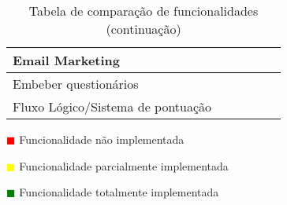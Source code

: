 \begin{table}[!ht]
\begin{center}
\begin{tabular}{|p{3cm}|p{0cm}|p{0cm}|p{0cm}|p{0cm}|p{0cm}|}
			Email Marketing &\cellcolor{red!80}  & \cellcolor{green!80} & \cellcolor{green!80} & \cellcolor{green!80} & \cellcolor{green!80}  \\ \hline
			
			 Embeber questionários& \cellcolor{green!80}  & \cellcolor{green!80}  & \cellcolor{green!80} & \cellcolor{green!80} & \cellcolor{green!80}  \\ \hline
			
			Fluxo Lógico/Sistema de pontuação &\cellcolor{yellow!80}  & \cellcolor{green!80} & \cellcolor{green!80} & \cellcolor{yellow!80} & \cellcolor{green!80}  \\ \hline
			
		
			
		\end{tabular}
	\end{center}
	\hspace{1.2cm}	\textcolor{red}{$\blacksquare$} Funcionalidade não implementada
	
	\hspace{1.2cm}     \textcolor{yellow}{$\blacksquare$} Funcionalidade parcialmente implementada
	
	\hspace{1.2cm}     \textcolor{green}{$\blacksquare$} Funcionalidade totalmente implementada 
	\begin{center}
		\caption{Tabela de comparação de funcionalidades (continuação)}
		\label{tab:comparacao2}
	\end{center}
\end{table}


\newpage

